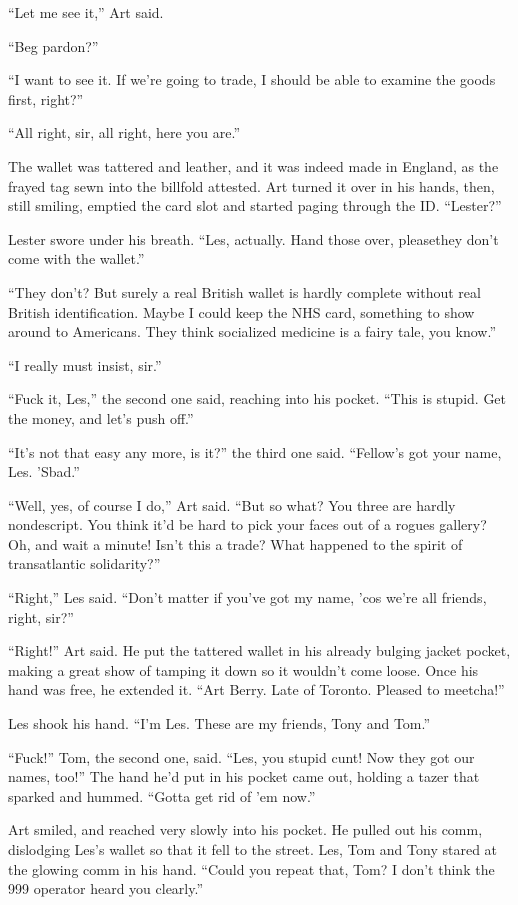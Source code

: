 “Let me see it,” Art said.

“Beg pardon?”

“I want to see it. If we’re going to trade, I should be able to
examine the goods first, right?”

“All right, sir, all right, here you are.”

The wallet was tattered and leather, and it was indeed made in
England, as the frayed tag sewn into the billfold attested. Art
turned it over in his hands, then, still smiling, emptied the card
slot and started paging through the ID. “Lester?”

Lester swore under his breath. “Les, actually. Hand those over,
please{\dash}they don’t come with the wallet.”

“They don’t? But surely a real British wallet is hardly complete
without real British identification. Maybe I could keep the NHS
card, something to show around to Americans. They think socialized
medicine is a fairy tale, you know.”

“I really must insist, sir.”

“Fuck it, Les,” the second one said, reaching into his pocket.
“This is stupid. Get the money, and let’s push off.”

“It’s not that easy any more, is it?” the third one said. “Fellow’s
got your name, Les. ’Sbad.”

“Well, yes, of course I do,” Art said. “But so what? You three are
hardly nondescript. You think it’d be hard to pick your faces out
of a rogues gallery? Oh, and wait a minute! Isn’t this a trade?
What happened to the spirit of transatlantic solidarity?”

“Right,” Les said. “Don’t matter if you’ve got my name, ’cos we’re
all friends, right, sir?”

“Right!” Art said. He put the tattered wallet in his already
bulging jacket pocket, making a great show of tamping it down so it
wouldn’t come loose. Once his hand was free, he extended it. “Art
Berry. Late of Toronto. Pleased to meetcha!”

Les shook his hand. “I’m Les. These are my friends, Tony and Tom.”

“Fuck!” Tom, the second one, said. “Les, you stupid cunt! Now they
got our names, too!” The hand he’d put in his pocket came out,
holding a tazer that sparked and hummed. “Gotta get rid of ’em
now.”

Art smiled, and reached very slowly into his pocket. He pulled out
his comm, dislodging Les’s wallet so that it fell to the street.
Les, Tom and Tony stared at the glowing comm in his hand. “Could
you repeat that, Tom? I don’t think the 999 operator heard you
clearly.”

